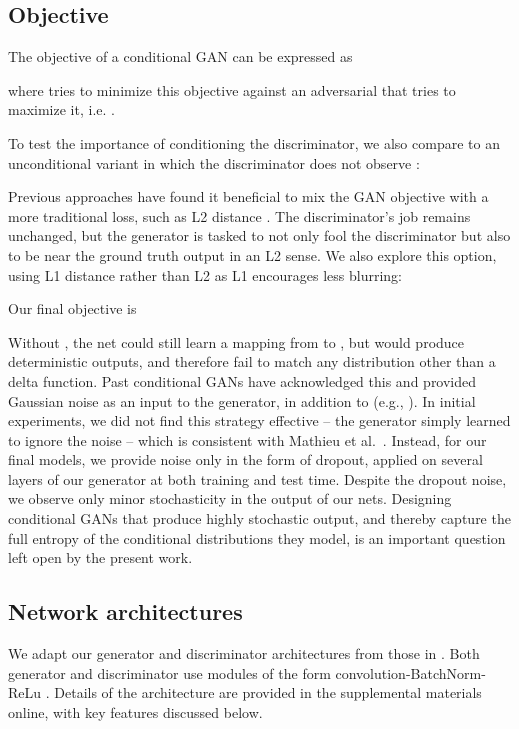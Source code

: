 \documentclass[10pt,twocolumn,letterpaper]{article}
\begin{document}
\subsection{Objective}

The objective of a conditional GAN can be expressed as

where  tries to minimize this objective against an adversarial  that tries to maximize it, i.e. .

To test the importance of conditioning the discriminator, we also compare to an unconditional variant in which the discriminator does not observe :

Previous approaches have found it beneficial to mix the GAN objective with a more traditional loss, such as L2 distance \cite{pathak2016context}. The discriminator's job remains unchanged, but the generator is tasked to not only fool the discriminator but also to be near the ground truth output in an L2 sense. We also explore this option, using L1 distance rather than L2 as L1 encourages less blurring:

Our final objective is


Without , the net could still learn a mapping from  to , but would produce deterministic outputs, and therefore fail to match any distribution other than a delta function. Past conditional GANs have acknowledged this and provided Gaussian noise  as an input to the generator, in addition to  (e.g., \cite{wang2016generative}). In initial experiments, we did not find this strategy effective -- the generator simply learned to ignore the noise -- which is consistent with Mathieu et al.~\cite{mathieu2015deep}. Instead, for our final models, we provide noise only in the form of dropout, applied on several layers of our generator at both training and test time. Despite the dropout noise, we observe only minor stochasticity in the output of our nets. Designing conditional GANs that produce highly stochastic output, and thereby capture the full entropy of the conditional distributions they model, is an important question left open by the present work.


\subsection{Network architectures}

We adapt our generator and discriminator architectures from those in \cite{radford2015unsupervised}. Both generator and discriminator use modules of the form convolution-BatchNorm-ReLu \cite{ioffe2015batch}. Details of the architecture are provided in the supplemental materials online, with key features discussed below.
\end{document}
